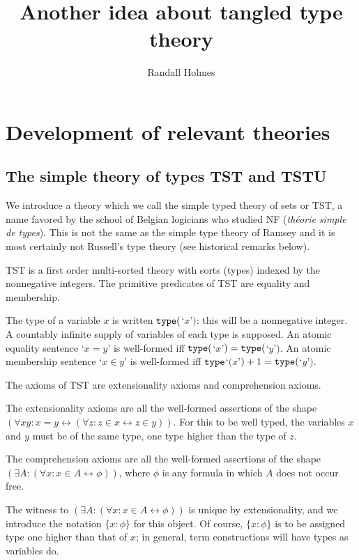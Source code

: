 \documentclass[12pt]{article}
\title{Another idea about tangled type theory}
\author{Randall Holmes}
\begin{document}
\maketitle

\tableofcontents

\newpage

\section{Development of relevant theories}

\subsection{The simple theory of types TST and TSTU}

We introduce a theory which we call the simple typed theory of sets or TST, a name favored by the school of Belgian logicians who studied NF ({\em th\'eorie simple de types}).  This is not the same as the simple type theory of Ramsey and it is most certainly not Russell's type theory  (see historical remarks below).

TST is a first order multi-sorted theory with sorts (types) indexed by the nonnegative integers.  The primitive predicates of TST are equality and membership.

The type of a variable $x$ is written ${\tt type}($`$x$'$)$:  this will be a nonnegative integer.   A countably infinite supply of variables of each type is supposed.  An atomic equality sentence `$x=y$' is well-formed iff ${\tt type}($`$x$'$)={\tt type}($`$y$'$)$.
An atomic membership sentence `$x \in y$' is well-formed iff ${\tt type}$`$(x$'$)+1 = {\tt type}($`$y$'$)$.

The axioms of TST are extensionality axioms and comprehension axioms.

The extensionality axioms are all the well-formed assertions of the shape $(\forall xy:x=y \leftrightarrow (\forall z:z \in x \leftrightarrow z\in y))$.  For this to be well typed, the variables
$x$ and $y$ must be of the same type, one type higher than the type of $z$.

The comprehension axioms are all the well-formed assertions of the shape $(\exists A:(\forall x:x \in A \leftrightarrow \phi))$, where $\phi$ is any formula in which $A$ does not occur free.

The witness to $(\exists A:(\forall x:x \in A \leftrightarrow \phi))$ is unique by extensionality, and we introduce the notation $\{x:\phi\}$ for this object.  Of course, $\{x:\phi\}$  is to be assigned type one higher than that of $x$;  in general, term constructions will have types as variables do.
\end{document}
